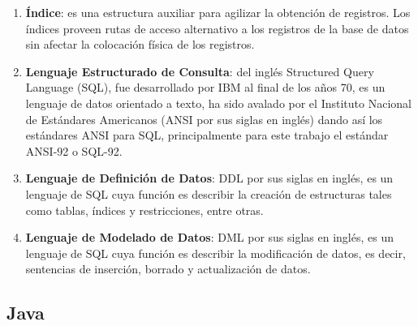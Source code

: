 \begin{enumerate}
\begin{enumerate}
	\end{enumerate}
	\item \textbf{Índice}: es una estructura auxiliar para agilizar la obtención de registros. Los índices proveen rutas de acceso alternativo a los registros de la base de datos sin afectar la colocación física de los registros\cite{FundamentalsOfDBSystems}.
	\item \textbf{Lenguaje Estructurado de Consulta}\label{sec-sql}: del inglés Structured Query Language (SQL), fue desarrollado por IBM\textsuperscript{\textcopyright} al final de los años 70, es un lenguaje de datos orientado a texto, ha sido avalado por el Instituto Nacional de Estándares Americanos (ANSI por sus siglas en inglés) dando así los estándares ANSI para SQL, principalmente para este trabajo el estándar ANSI-92 o SQL-92.
	\item \textbf{Lenguaje de Definición de Datos}: DDL por sus siglas en inglés, es un lenguaje de SQL cuya función es describir la creación de estructuras tales como tablas, índices y restricciones, entre otras\cite{DataBaseConcepts}.
	\item \textbf{Lenguaje de Modelado de Datos}: DML por sus siglas en inglés, es un lenguaje de SQL cuya función es describir la modificación de datos, es decir, sentencias de inserción, borrado y actualización de datos\cite{DataBaseConcepts}.  
\end{enumerate}

\subsection{Java}\label{sec-java}

